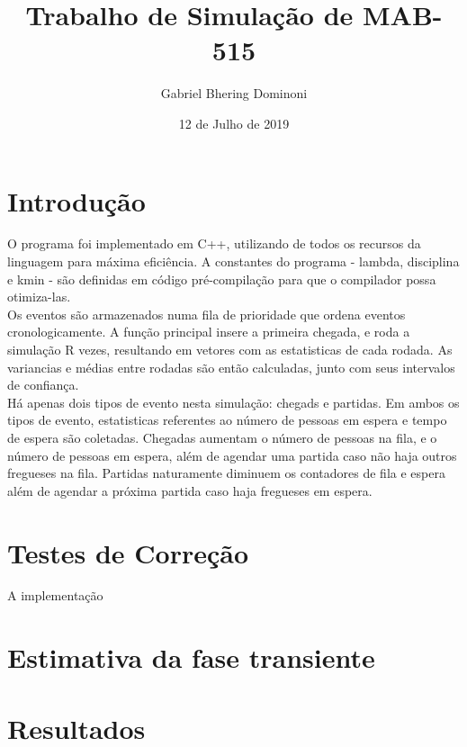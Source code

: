 \documentclass{article}
\title{Trabalho de Simulação de MAB-515}
\author{ Gabriel Bhering Dominoni }
\date{12 de Julho de 2019}
\begin{document}
\maketitle
\thispagestyle{empty}

\pagebreak

\tableofcontents

\pagebreak

\section{Introdução}
O programa foi implementado em C++, utilizando de todos os recursos da linguagem para máxima eficiência. A constantes do programa - lambda, disciplina e kmin - são definidas em código pré-compilação para que o compilador possa otimiza-las. \\

Os eventos são armazenados numa fila de prioridade que ordena eventos cronologicamente. A função principal insere a primeira chegada, e roda a simulação R vezes, resultando em vetores com as estatisticas de cada rodada. As variancias e médias entre rodadas são então calculadas, junto com seus intervalos de confiança. \\

Há apenas dois tipos de evento nesta simulação: chegads e partidas. Em ambos os tipos de evento, estatisticas referentes ao número de pessoas em espera e tempo de espera são coletadas. Chegadas aumentam o número de pessoas na fila, e o número de pessoas em espera, além de agendar uma partida caso não haja outros fregueses na fila. Partidas naturamente diminuem os contadores de fila e espera além de agendar a próxima partida caso haja fregueses em espera. \\

\section{Testes de Correção}
A implementação 

\section{Estimativa da fase transiente}

\section{Resultados}
\end{document}
